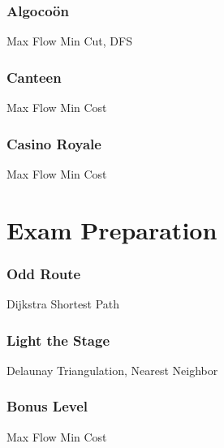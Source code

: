 \documentclass[10pt,a4paper,twoside]{report}
\begin{document}
\newpage
\subsection*{Algoco\"on}
\begin{keywords}Max Flow Min Cut, DFS\end{keywords}


\newpage
\subsection*{Canteen}
\begin{keywords}Max Flow Min Cost\end{keywords}


\newpage
\subsection*{Casino Royale}
\begin{keywords}Max Flow Min Cost\end{keywords}



\chapter{Exam Preparation}

\subsection*{Odd Route}
\begin{keywords}Dijkstra Shortest Path\end{keywords}


\newpage
\subsection*{Light the Stage}
\begin{keywords}Delaunay Triangulation, Nearest Neighbor\end{keywords}


\newpage
\subsection*{Bonus Level}
\begin{keywords}Max Flow Min Cost\end{keywords}

\end{document}
